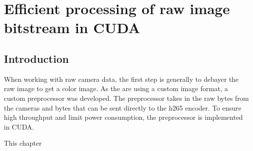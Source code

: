 \chapter{Efficient processing of raw image bitstream in CUDA}

\section{Introduction}
When working with raw camera data, the first step is generally to debayer the raw image to get a color image.
As the \cams are using a custom image format, a custom preprocessor was developed.
The preprocessor takes in the raw bytes from the cameras and bytes that can be sent directly to the \gls{h265} encoder.
To ensure high throughput and limit power consumption, the preprocessor is implemented in CUDA.

This chapter 
